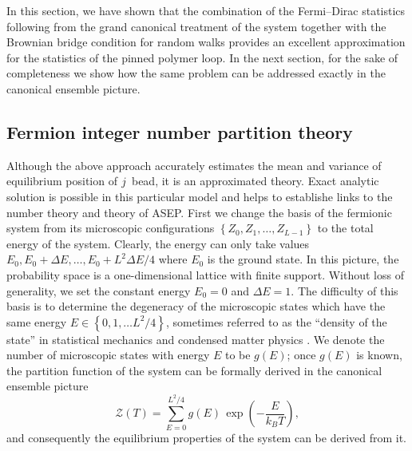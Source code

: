 \documentclass[aps,showpacs,twocolumn,floatfix,prx,superscriptaddress]{revtex4-1}
\begin{document}
In this section, we have shown that the combination of the Fermi--Dirac statistics following from the grand canonical treatment of the system together with the Brownian bridge condition for random walks provides an excellent approximation for the statistics of the pinned polymer loop. In the next section, for the sake of completeness we show how the same problem can be addressed exactly in the canonical ensemble picture.

\subsection{Fermion integer number partition theory}
\label{sec:numberPartition}

Although the above approach accurately estimates the mean and variance of equilibrium position of $j^{\rm}$ bead, it is an approximated theory. Exact analytic solution is possible in this particular model and helps to establishe links to the number theory and theory of ASEP. First we change the basis of the fermionic system from its microscopic configurations $\left\{Z_0,Z_1,\ldots,Z_{L-1}\right\}$ to the total energy of the system. Clearly, the energy can only take values $E_0, E_0+\Delta E, \ldots, E_0 + L^2 \Delta E / 4$ where $E_0$ is the ground state. In this picture, the probability space is a one-dimensional lattice with finite support. Without loss of generality, we set the constant energy $E_0=0$ and $\Delta E=1$. The difficulty of this basis is to determine the degeneracy of the microscopic states which have the same energy $E \in \left\{0,1,\ldots L^2/4\right\}$, sometimes referred to as the ``density of the state'' in statistical mechanics \cite{huang1987statistical} and condensed matter physics \cite{sander2009advanced}. We denote the number of microscopic states with energy $E$ to be $g(E)$; once $g(E)$ is known, the partition function of the system can be formally derived in the canonical ensemble picture
\begin{equation}
\mathcal{Z}\left(T\right) = \sum_{E=0}^{L^2/4} g(E) \, \exp \left(-\frac{E}{k_B T}\right),
\label{eq:par_func}
\end{equation}
and consequently the equilibrium properties of the system can be derived from it. 
\end{document}
